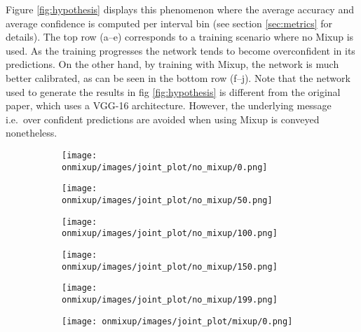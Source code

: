 \documentclass{article}
\begin{document}
Figure \ref{fig:hypothesis} displays this phenomenon where the average accuracy and average confidence is computed per interval bin (see section \ref{sec:metrics} for details). The top row (a--e) corresponds to a training scenario where no Mixup is used. As the training progresses the network tends to become overconfident in its predictions. %
On the other hand, by training with Mixup, the network is much better calibrated, as can be seen in the bottom row (f--j). Note that the network used to generate the results in fig \ref{fig:hypothesis} is different from the original paper, which uses a VGG-16 architecture. However, the underlying message i.e.\ over confident predictions are avoided when using Mixup is conveyed nonetheless.  
\begin{figure}[htb]
     \centering
     \begin{subfigure}[b]{0.19\textwidth}
         \centering
         \noindent\texttt{[image: onmixup/images/joint\_plot/no\_mixup/0.png]}
         \caption{}
     \end{subfigure}
     \hfill
     \begin{subfigure}[b]{0.19\textwidth}
         \centering
         \noindent\texttt{[image: onmixup/images/joint\_plot/no\_mixup/50.png]}
         \caption{}
     \end{subfigure}
     \hfill
     \begin{subfigure}[b]{0.19\textwidth}
         \centering
         \noindent\texttt{[image: onmixup/images/joint\_plot/no\_mixup/100.png]}
         \caption{}
     \end{subfigure}
          \centering
     \begin{subfigure}[b]{0.19\textwidth}
         \centering
         \noindent\texttt{[image: onmixup/images/joint\_plot/no\_mixup/150.png]}
         \caption{}
     \end{subfigure}
     \hfill
     \begin{subfigure}[b]{0.19\textwidth}
         \centering
         \noindent\texttt{[image: onmixup/images/joint\_plot/no\_mixup/199.png]}
         \caption{}
     \end{subfigure}
         \centering
     \begin{subfigure}[b]{0.19\textwidth}
         \centering
         \noindent\texttt{[image: onmixup/images/joint\_plot/mixup/0.png]}
         \caption{}
     \end{subfigure}
     \hfill
     \begin{subfigure}[b]{0.19\textwidth}

\end{subfigure}
\end{figure}
\end{document}
